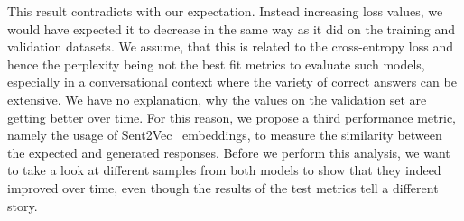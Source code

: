 This result contradicts with our expectation. Instead increasing loss values, we would have expected it to decrease in the same way as it did on the training and validation datasets. We assume, that this is related to the cross-entropy loss and hence the perplexity being not the best fit metrics to evaluate such models, especially in a conversational context where the variety of correct answers can be extensive. We have no explanation, why the values on the validation set are getting better over time. For this reason, we propose a third performance metric, namely the usage of Sent2Vec~\cite{Pgj:2017} embeddings, to measure the similarity between the expected and generated responses. Before we perform this analysis, we want to take a look at different samples from both models to show that they indeed improved over time, even though the results of the test metrics tell a different story.

